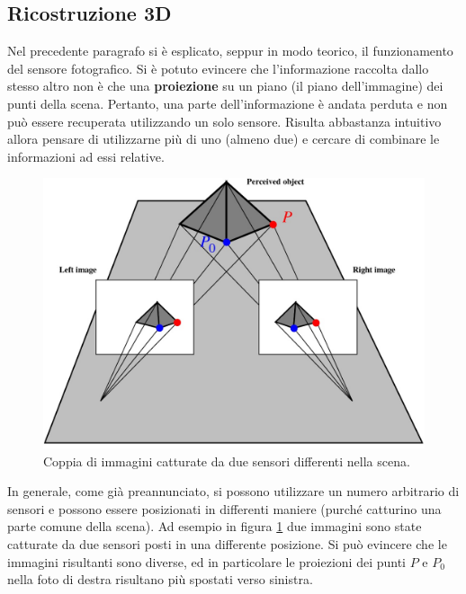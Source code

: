 \subsection{Ricostruzione 3D}
\label{sec:stereo:ric3d}
Nel precedente paragrafo si è esplicato, seppur in modo teorico, il funzionamento del sensore fotografico. Si è potuto evincere che l'informazione raccolta dallo stesso altro non è che una \textbf{proiezione} su un piano (il piano dell'immagine) dei punti della scena. Pertanto, una parte dell'informazione è andata perduta e non può essere recuperata utilizzando un solo sensore. Risulta abbastanza intuitivo allora pensare di utilizzarne più di uno (almeno due) e cercare di combinare le informazioni ad essi relative.
\begin{figure}[h!]
	\centering
	\includegraphics[width=420pt]{imgs/stereo2.jpg}
	\caption{Coppia di immagini catturate da due sensori differenti nella scena.}
	\label{vis:stereo:pair}
\end{figure} 
In generale, come già preannunciato, si possono utilizzare un numero arbitrario di sensori e possono essere posizionati in differenti maniere (purché catturino una parte comune della scena). Ad esempio in figura \ref{vis:stereo:pair} due immagini sono state catturate da due sensori posti in una differente posizione. Si può evincere che le immagini risultanti sono diverse, ed in particolare le proiezioni dei punti $P$ e $P_0$ nella foto di destra risultano più spostati verso sinistra.

